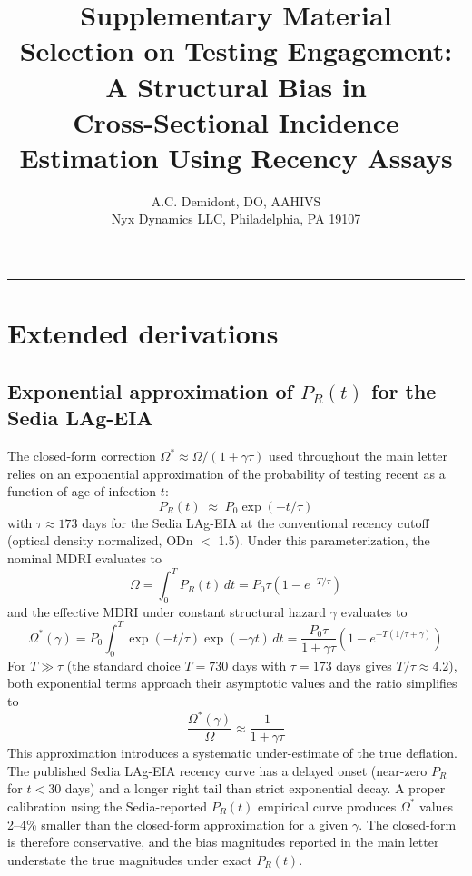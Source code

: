 \documentclass[11pt]{article}
\title{\textbf{Supplementary Material}\\[0.4em]
\large Selection on Testing Engagement: A Structural Bias in\\
Cross-Sectional Incidence Estimation Using Recency Assays}
\author{A.C. Demidont, DO, AAHIVS\\ Nyx Dynamics LLC, Philadelphia, PA 19107}
\date{}
\begin{document}
\maketitle
\onehalfspacing

\tableofcontents
\vspace{1em}
\hrule
\vspace{1em}

\section{Extended derivations}

\subsection{Exponential approximation of $P_R(t)$ for the Sedia LAg-EIA}

The closed-form correction $\Omega^* \approx \Omega/(1+\gamma\tau)$ used throughout the main letter relies on an exponential approximation of the probability of testing recent as a function of age-of-infection $t$:
\begin{equation}
P_R(t) \;\approx\; P_0 \exp(-t/\tau) \label{eq:PR_exp}
\end{equation}
with $\tau \approx 173$ days for the Sedia LAg-EIA at the conventional recency cutoff (optical density normalized, ODn $<$ 1.5). Under this parameterization, the nominal MDRI evaluates to
\begin{equation}
\Omega = \int_0^T P_R(t)\,dt = P_0 \tau (1 - e^{-T/\tau})
\end{equation}
and the effective MDRI under constant structural hazard $\gamma$ evaluates to
\begin{equation}
\Omega^*(\gamma) = P_0 \int_0^T \exp(-t/\tau) \exp(-\gamma t)\,dt
= \frac{P_0\tau}{1 + \gamma\tau}\left(1 - e^{-T(1/\tau + \gamma)}\right)
\end{equation}
For $T \gg \tau$ (the standard choice $T = 730$ days with $\tau = 173$ days gives $T/\tau \approx 4.2$), both exponential terms approach their asymptotic values and the ratio simplifies to
\begin{equation}
\frac{\Omega^*(\gamma)}{\Omega} \approx \frac{1}{1 + \gamma\tau}
\end{equation}
This approximation introduces a systematic under-estimate of the true deflation. The published Sedia LAg-EIA recency curve has a delayed onset (near-zero $P_R$ for $t < 30$ days) and a longer right tail than strict exponential decay. A proper calibration using the Sedia-reported $P_R(t)$ empirical curve produces $\Omega^*$ values 2--4\% smaller than the closed-form approximation for a given $\gamma$. The closed-form is therefore conservative, and the bias magnitudes reported in the main letter understate the true magnitudes under exact $P_R(t)$.
\end{document}
